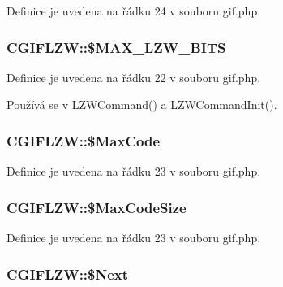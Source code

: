 Definice je uvedena na řádku 24 v souboru gif.\-php.

\hypertarget{class_c_g_i_f_l_z_w_a414f88e2a8698fb6d7f12cd0b5ffd5db}{
\subsubsection[{\$\-M\-A\-X\-\_\-\-L\-Z\-W\-\_\-\-B\-I\-T\-S}]{\setlength{\rightskip}{0pt plus 5cm}C\-G\-I\-F\-L\-Z\-W\-::\$\-M\-A\-X\-\_\-\-L\-Z\-W\-\_\-\-B\-I\-T\-S}}\label{class_c_g_i_f_l_z_w_a414f88e2a8698fb6d7f12cd0b5ffd5db}


Definice je uvedena na řádku 22 v souboru gif.\-php.



Používá se v L\-Z\-W\-Command() a L\-Z\-W\-Command\-Init().

\hypertarget{class_c_g_i_f_l_z_w_a0b8ce40209d82a47639c146b12d8384d}{
\subsubsection[{\$\-Max\-Code}]{\setlength{\rightskip}{0pt plus 5cm}C\-G\-I\-F\-L\-Z\-W\-::\$\-Max\-Code}}\label{class_c_g_i_f_l_z_w_a0b8ce40209d82a47639c146b12d8384d}


Definice je uvedena na řádku 23 v souboru gif.\-php.

\hypertarget{class_c_g_i_f_l_z_w_ae213898587328adcd63f63e2b4def909}{
\subsubsection[{\$\-Max\-Code\-Size}]{\setlength{\rightskip}{0pt plus 5cm}C\-G\-I\-F\-L\-Z\-W\-::\$\-Max\-Code\-Size}}\label{class_c_g_i_f_l_z_w_ae213898587328adcd63f63e2b4def909}


Definice je uvedena na řádku 23 v souboru gif.\-php.

\hypertarget{class_c_g_i_f_l_z_w_aa8b6dfebe472aebfcc74fefcc909f5ea}{
\subsubsection[{\$\-Next}]{\setlength{\rightskip}{0pt plus 5cm}C\-G\-I\-F\-L\-Z\-W\-::\$\-Next}}\label{class_c_g_i_f_l_z_w_aa8b6dfebe472aebfcc74fefcc909f5ea}


